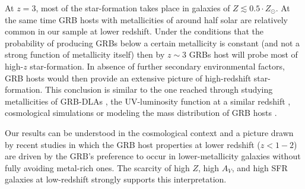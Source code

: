 \documentclass[traditabstract, longauth]{aa}
\begin{document}
At $z=3$, most of the star-formation takes place in galaxies of $Z\lesssim0.5\cdot Z_\odot$. At the same time GRB hosts with metallicities of around half solar are relatively common in our sample at lower redshift. Under the conditions that the probability of producing GRBs below a certain metallicity is constant (and not a strong function of metallicity itself) then by $z\sim3$ GRBs host will probe most of high-$z$ star-formation. In absence of further secondary environmental factors, GRB hosts would then provide an extensive picture of high-redshift star-formation. This conclusion is similar to the one reached through studying metallicities of GRB-DLAs \citep{2008ApJ...683..321F, 2014arXiv1410.3510A}, the UV-luminosity function at a similar redshift \citep{2005MNRAS.362..245J, 2015arXiv150304246S, 2015arXiv150305323G}, cosmological simulations \citep{2010MNRAS.408..647C} or modeling the mass distribution of GRB hosts \citep{2009ApJ...702..377K}.

Our results can be understood in the cosmological context and a picture drawn by recent studies \citep{2008AJ....135.1136M, 2009ApJ...702..377K, 2013ApJ...778..128P, 2014arXiv1409.7064V, 2014arXiv1406.1503T, 2015arXiv150402479P,  2015arXiv150304246S} in which the GRB host properties at lower redshift ($z < 1-2$) are driven by the GRB's preference to occur in lower-metallicity galaxies without fully avoiding metal-rich ones. The scarcity of high $Z$, high $A_V$, and high SFR galaxies at low-redshift strongly supports this interpretation.
\end{document}
